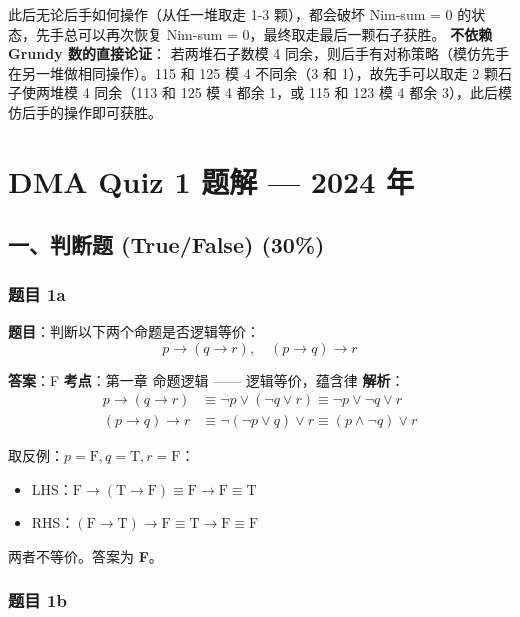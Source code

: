 \documentclass[10pt,a4paper,openany]{ctexbook}
\theoremstyle{definition}
\theoremstyle{remark}
\begin{document}
此后无论后手如何操作（从任一堆取走 1-3 颗），都会破坏 Nim-sum = 0 的状态，先手总可以再次恢复 Nim-sum = 0，最终取走最后一颗石子获胜。
\textbf{不依赖 Grundy 数的直接论证}：
若两堆石子数模 4 同余，则后手有对称策略（模仿先手在另一堆做相同操作）。115 和 125 模 4 不同余（3 和 1），故先手可以取走 2 颗石子使两堆模 4 同余（113 和 125 模 4 都余 1，或 115 和 123 模 4 都余 3），此后模仿后手的操作即可获胜。


\section{DMA Quiz 1 题解 — 2024 年}

\subsection{一、判断题 (True/False) (30\%)}

\subsubsection{题目 1a}

\textbf{题目}：判断以下两个命题是否逻辑等价：
\[
p \to (q \to r),\quad (p \to q) \to r
\]

\textbf{答案}：F
\textbf{考点}：第一章 命题逻辑 —— 逻辑等价，蕴含律
\textbf{解析}：
\[
\begin{aligned}
p \to (q \to r) &\equiv \neg p \lor (\neg q \lor r) \equiv \neg p \lor \neg q \lor r \\
(p \to q) \to r &\equiv \neg(\neg p \lor q) \lor r \equiv (p \land \neg q) \lor r
\end{aligned}
\]

取反例：$p = \mathrm{F}, q = \mathrm{T}, r = \mathrm{F}$：
\begin{itemize}
\item LHS：$\mathrm{F} \to (\mathrm{T} \to \mathrm{F}) \equiv \mathrm{F} \to \mathrm{F} \equiv \mathrm{T}$
\item RHS：$(\mathrm{F} \to \mathrm{T}) \to \mathrm{F} \equiv \mathrm{T} \to \mathrm{F} \equiv \mathrm{F}$

\end{itemize}

两者不等价。答案为 \textbf{F}。
\vspace{-2pt}

\subsubsection{题目 1b}
\end{document}
